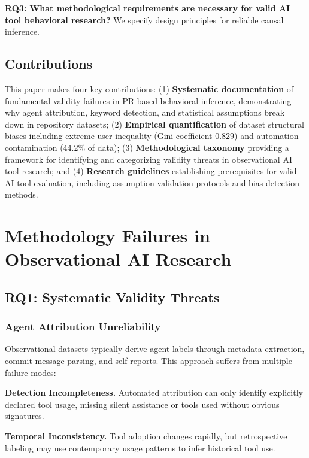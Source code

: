 \documentclass[conference]{IEEEtran}
\begin{document}
\textbf{RQ3: What methodological requirements are necessary for valid AI tool behavioral research?} We specify design principles for reliable causal inference.

\subsection{Contributions}

This paper makes four key contributions: (1) \textbf{Systematic documentation} of fundamental validity failures in PR-based behavioral inference, demonstrating why agent attribution, keyword detection, and statistical assumptions break down in repository datasets; (2) \textbf{Empirical quantification} of dataset structural biases including extreme user inequality (Gini coefficient 0.829) and automation contamination (44.2\% of data); (3) \textbf{Methodological taxonomy} providing a framework for identifying and categorizing validity threats in observational AI tool research; and (4) \textbf{Research guidelines} establishing prerequisites for valid AI tool evaluation, including assumption validation protocols and bias detection methods.

\section{Methodology Failures in Observational AI Research}

\subsection{RQ1: Systematic Validity Threats}

\subsubsection{Agent Attribution Unreliability}

Observational datasets typically derive agent labels through metadata extraction, commit message parsing, and self-reports. This approach suffers from multiple failure modes:

\textbf{Detection Incompleteness.} Automated attribution can only identify explicitly declared tool usage, missing silent assistance or tools used without obvious signatures.

\textbf{Temporal Inconsistency.} Tool adoption changes rapidly, but retrospective labeling may use contemporary usage patterns to infer historical tool use.
\end{document}
